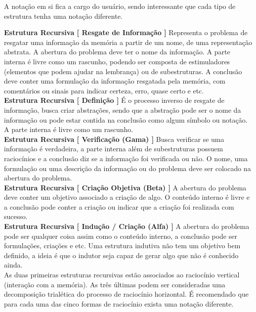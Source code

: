 \documentclass[10pt,a4paper]{report}
\begin{document}
A notação em si fica a cargo do usuário, sendo interessante que cada tipo de estrutura tenha uma notação diferente.

\hspace{\baselineskip}

\textbf{Estrutura Recursiva [ Resgate de Informação ]} Representa o problema de resgatar uma informação da memória a partir de um nome, de uma representação abstrata. A abertura do problema deve ter o nome da informação. A parte interna é livre como um rascunho, podendo ser composta de estimuladores (elementos que podem ajudar na lembrança) ou de subestruturas. A conclusão deve conter uma formulação da informação resgatada pela memória, com comentários ou sinais para indicar certeza, erro, quase certo e etc.\\

\textbf{Estrutura Recursiva [ Definição ]} É o processo inverso de resgate de informação, busca criar abstrações, sendo que a abstração pode ser o nome da informação ou pode estar contida na conclusão como algum símbolo ou notação. A parte interna é livre como um rascunho.\\

\textbf{Estrutura Recursiva [ Verificação (Gama) ]} Busca verificar se uma informação é verdadeira, a parte interna além de subestruturas possuem raciocínios e a conclusão diz se a informação foi verificada ou não. O nome, uma formulação ou uma descrição da informação ou do problema deve ser colocado na abertura do problema. \\

\textbf{Estrutura Recursiva [ Criação Objetiva (Beta) ]} A abertura do problema deve conter um objetivo associado a criação de algo. O conteúdo interno é livre e a conclusão pode conter a criação ou indicar que a criação foi realizada com sucesso.\\

\textbf{Estrutura Recursiva [ Indução / Criação (Alfa) ]} A abertura do problema pode ser qualquer coisa assim como o conteúdo interno, a conclusão pode ser formulações, criações e etc. Uma estrutura indutiva não tem um objetivo bem definido, a ideia é que o indutor seja capaz de gerar algo que não é conhecido ainda.\\

As duas primeiras estruturas recursivas estão associados ao raciocínio vertical (interação com a memória). As três últimas podem ser consideradas uma decomposição trialética do processo de raciocínio horizontal. É recomendado que para cada uma das cinco formas de raciocínio exista uma notação diferente.\\
\end{document}
